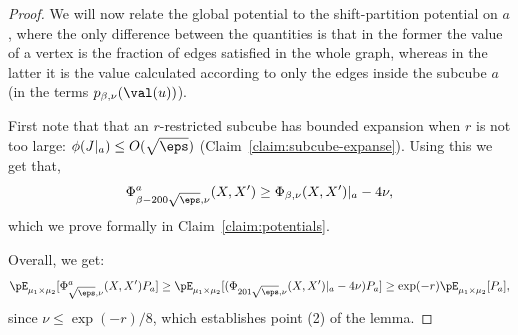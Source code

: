 \begin{proof}
We will now relate the global potential to the shift-partition potential on $a$, where the only difference between the quantities is that in the former the value of a vertex is the fraction of edges satisfied in the whole graph, whereas in the latter it is the value calculated according to only the edges inside the subcube $a$ (in the terms $p_{\beta,\nu}(\val(u))$).

First note that that an $r$-restricted subcube has bounded expansion when $r$ is not too large: $\phi(J|_a) \leq O(\sqrt{\eps})$ (Claim~\ref{claim:subcube-expanse}). Using this we get that,
\[
\Phi^a_{\beta -200\sqrt{\eps},\nu}(X,X') \ge \Phi_{\beta,\nu}(X,X')|_a - 4\nu,
\]
which we prove formally in Claim~\ref{claim:potentials}.



Overall, we get:
\[\pE_{\mu_1 \times \mu_2}[\Phi^a_{\sqrt{\eps},\nu}(X,X')P_a] \ge \pE_{\mu_1 \times \mu_2}[(\Phi_{201\sqrt{\eps},\nu}(X,X')|_a - 4\nu) P_a] \geq \exp(-r)\pE_{\mu_1 \times \mu_2}[P_a],\]
since $\nu \leq \exp(-r)/8$, which establishes point (2) of the 
lemma.


\end{proof}

